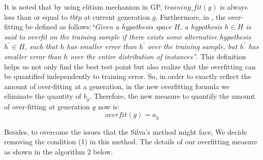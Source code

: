 \begin{enumerate}
\begin{enumerate}
It is noted that by using elitism mechanism in GP, $training\_fit(g)$ is always less than or equal to $tbtp$ at current generation $g$. Furthermore, in \cite{1996Mitchell}, the over-fitting be defined as follows:\textit{\textquotedblleft Given a hypothesis space $H$, a hypothesis $h \in H$ is said to overfit on the training sample if there exists some alternative hypothesis ${h}^{'} \in H$, such that $h$ has smaller error than ${h}^{'}$ over the training sample, but ${h}^{'}$ has smaller error than $h$ over the entire distribution of instances\textquotedblright}. This definition helps us not only find the best test point but also realize that the overfitting can be quantified independently to training error. So, in order to exactly reflect the amount of over-fitting at a generation, in the new overfitting formula we eliminate the quantity of $b_{g}$. Therefore, the new measure to quantify the amount of over-fitting at generation $g$ now is:
\begin{equation}
overfit (g) = a_{g} 	
\end{equation} \par

Besides, to overcome the issues that the Silva's method might face, We decide removing the condition (1) in this method. The details of our overfitting measure as shown in the algorithm 2 below.


\end{enumerate}
\end{enumerate}
